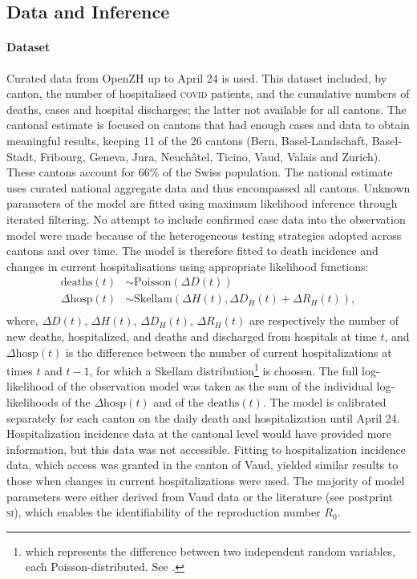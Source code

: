 \subsection{Data and Inference} 
\paragraph{Dataset} Curated data from OpenZH\cite[3\baselineskip]{openZH:OpenZHCovid19:2020} up to April 24 is used. This dataset included, by canton, the number of hospitalised \textsc{covid} patients, and the cumulative numbers of deaths, cases and hospital discharges; the latter not available for all cantons. The cantonal estimate is focused on cantons that had enough cases and data to obtain meaningful results, keeping 11 of the 26 cantons (Bern, Basel-Landschaft, Basel-Stadt, Fribourg, Geneva, Jura, Neuchâtel, Ticino, Vaud, Valais and Zurich). These cantons account for 66\% of the Swiss population. The national estimate uses curated national aggregate data and thus encompassed all cantons\cite{Probst:DaenuprobstCovid19casesswitzerland:2020}. Unknown parameters of the model are fitted using maximum likelihood inference through iterated filtering\cite{Ionides:InferenceDynamicLatent:2015}. No attempt to include confirmed case data into the observation model were made because of the heterogeneous testing strategies adopted across cantons and over time. The model is therefore fitted to death incidence and changes in current hospitalisations using appropriate likelihood functions:
\begin{equation}
\begin{split}
 \text{deaths}(t) &\sim \text{Poisson}(\Delta D(t)) \\
\Delta  \text{hosp}(t) &\sim \text{Skellam}(\Delta H(t), \Delta D_H(t) + \Delta R_H(t)), \\
\end{split}
\end{equation}
\noindent where, $\Delta D(t)$, $\Delta H(t)$, $\Delta D_H(t)$, $\Delta R_H(t)$ are respectively the number of new deaths, hospitalized, and deaths and discharged from hospitals at time $t$, and $\Delta \text{hosp}(t)$ is the difference between the number of current hospitalizations at times $t$ and $t-1$, for which a Skellam distribution\footnote{which represents the difference between two independent random variables, each Poisson-distributed. See .} is choosen. The full log-likelihood of the observation model was taken as the sum of the individual log-likelihoods of the $\Delta \text{hosp}(t)$ and of the $\text{deaths}(t)$. 
The model is calibrated separately for each canton on the daily death and hospitalization until April 24. Hospitalization incidence data at the cantonal level would have provided more information, but this data was not accessible. Fitting to hospitalization incidence data, which access was granted in the canton of Vaud, yielded similar results to those when changes in current hospitalizations were used. The majority of model parameters were either derived from Vaud data or the literature (see postprint \textsc{si}), which enables the identifiability of the reproduction number $R_0$.
 
